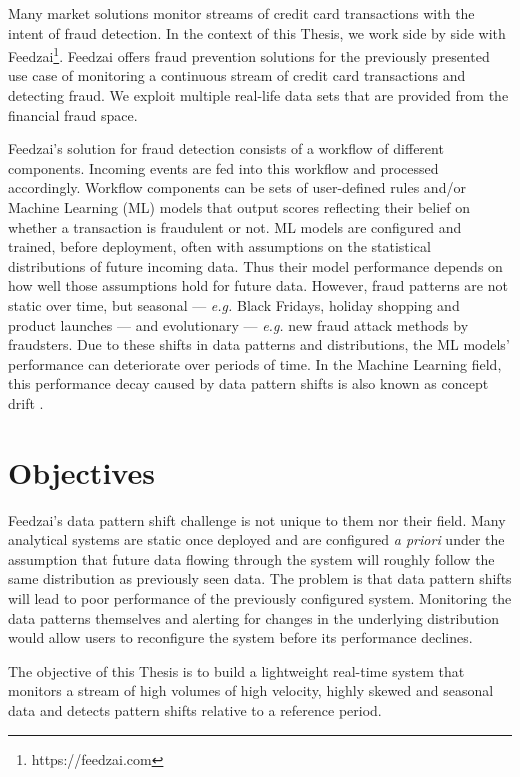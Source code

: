 Many market solutions monitor streams of credit card transactions with the intent of fraud detection. In the context of this Thesis, we work side by side with Feedzai\footnote{https://feedzai.com}. Feedzai offers fraud prevention solutions for the previously presented use case of monitoring a continuous stream of credit card transactions and detecting fraud. We exploit multiple real-life data sets that are provided from the financial fraud space. 

Feedzai's solution for fraud detection consists of a workflow of different components. Incoming events are fed into this workflow and processed accordingly. Workflow components can be sets of user-defined rules and/or Machine Learning (ML) models that output scores reflecting their belief on whether a transaction is fraudulent or not. ML models are configured and trained,  before deployment, often with assumptions on the statistical distributions of future incoming data. Thus their model performance depends on how well those assumptions hold for future data. However, fraud patterns are not static over time, but seasonal --- \textit{e.g.} Black Fridays, holiday shopping and product launches --- and evolutionary --- \textit{e.g.} new fraud attack methods by fraudsters. Due to these shifts in data patterns and distributions, the ML models' performance can deteriorate over periods of time. In the Machine Learning field, this performance decay caused by data pattern shifts is also known as concept drift \cite{drift} \cite{gama-drift}.

\section{Objectives} \label{sec:objectives}
Feedzai's data pattern shift challenge is not unique to them nor their field. Many analytical systems are static once deployed and are configured \textit{a priori} under the assumption that future data flowing through the system will roughly follow the same distribution as previously seen data.
The problem is that data pattern shifts will lead to poor performance of the previously configured system. Monitoring the data patterns themselves and alerting for changes in the underlying distribution would allow users to reconfigure the system before its performance declines.

The objective of this Thesis is to build a lightweight real-time system that monitors a stream of high volumes of high velocity, highly skewed and seasonal data and detects pattern shifts relative to a reference period.

